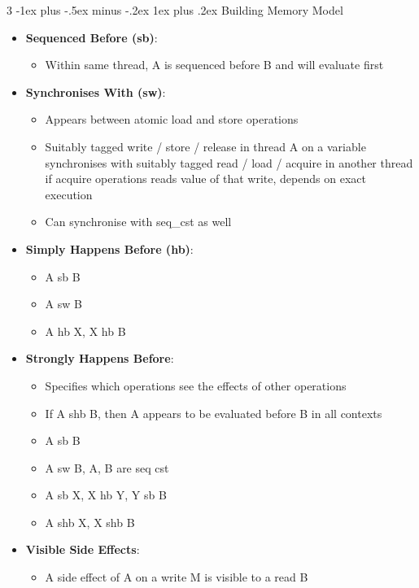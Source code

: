 \documentclass[10pt, landscape]{article}
\makeatletter
\renewcommand{\subsection}{\@startsection{subsection}{3}{0mm}%
                                {-1ex plus -.5ex minus -.2ex}%
                                {1ex plus .2ex}%
                                {\normalfont\small\bfseries}}%
\makeatother
\begin{document}
\begin{multicols*}{3}
\subsection{Building Memory Model}
\begin{itemize}
    \item \textbf{Sequenced Before (sb)}:
    \begin{itemize}
        \item Within same thread, A is sequenced before B and will evaluate first
    \end{itemize}
    \item \textbf{Synchronises With (sw)}:
    \begin{itemize}
        \item Appears between atomic load and store operations
        \item Suitably tagged write / store / release in thread A on a variable synchronises with suitably tagged read / load / acquire in another thread if acquire operations reads value of that write, depends on exact execution
        \item Can synchronise with seq\_cst as well
    \end{itemize}
    \item \textbf{Simply Happens Before (hb)}:
    \begin{itemize}
        \item A sb B
        \item A sw B
        \item A hb X, X hb B
    \end{itemize}
    \item \textbf{Strongly Happens Before}:
    \begin{itemize}
        \item Specifies which operations see the effects of other operations
        \item If A shb B, then A appears to be evaluated before B in all contexts
        \item A sb B
        \item A sw B, A, B are seq cst
        \item A sb X, X hb Y, Y sb B
        \item A shb X, X shb B
    \end{itemize}
    \item \textbf{Visible Side Effects}:
    \begin{itemize}
        \item A side effect of A on a write M is visible to a read B

\end{itemize}
\end{itemize}
\end{multicols*}
\end{document}
